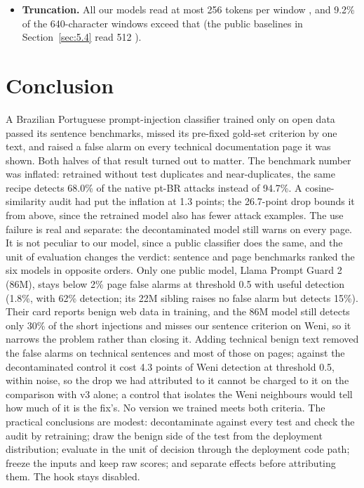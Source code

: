 \documentclass[11pt]{article}
\begin{document}
\begin{itemize}
.
\item \textbf{Truncation.} All our models read at most 256 tokens per window%
, and 9.2\% of the 640-character windows exceed that %
(the public baselines in Section~\ref{sec:5.4} read 512%
).
\end{itemize}

\section{Conclusion}\label{sec:11}

A Brazilian Portuguese prompt-injection classifier trained only on open data passed its sentence benchmarks, missed its pre-fixed gold-set criterion by one text, and raised a false alarm on every technical documentation page it was shown. Both halves of that result turned out to matter. The benchmark number was inflated: retrained without test duplicates and near-duplicates, the same recipe detects 68.0\% of the native pt-BR attacks instead of 94.7\%. A cosine-similarity audit had put the inflation at 1.3 points; the 26.7-point drop bounds it from above, since the retrained model also has fewer attack examples. The use failure is real and separate: the decontaminated model still warns on every page. It is not peculiar to our model, since a public classifier does the same, and the unit of evaluation changes the verdict: sentence and page benchmarks ranked the six models in opposite orders. Only one public model, Llama Prompt Guard 2 (86M), stays below 2\% page false alarms at threshold 0.5 with useful detection (1.8\%, with 62\% detection; its 22M sibling raises no false alarm but detects 15\%). Their card reports benign web data in training, and the 86M model still detects only 30\% of the short injections and misses our sentence criterion on Weni, so it narrows the problem rather than closing it. Adding technical benign text removed the false alarms on technical sentences and most of those on pages; against the decontaminated control it cost 4.3 points of Weni detection at threshold 0.5, within noise, so the drop we had attributed to it cannot be charged to it on the comparison with v3 alone; a control that isolates the Weni neighbours would tell how much of it is the fix's. No version we trained meets both criteria. The practical conclusions are modest: decontaminate against every test and check the audit by retraining; draw the benign side of the test from the deployment distribution; evaluate in the unit of decision through the deployment code path; freeze the inputs and keep raw scores; and separate effects before attributing them. The hook stays disabled.
\end{document}

